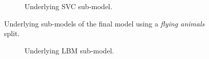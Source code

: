 \begin{figure}[ht]
\begin{subfigure}{.45\textwidth}
        \captionsetup{width=0.8\linewidth}
        \captionsetup{justification=centering}
        \caption{Underlying SVC sub-model.}
    \end{subfigure}
    \captionsetup{width=0.9\linewidth}
    \captionsetup{justification=centering}
    \caption{Underlying sub-models of the final model using a \textit{flying animals} split.}
\end{figure}

\begin{figure}[ht]
    \centering
    \begin{subfigure}{.45\textwidth}
        \centering
        \captionsetup{width=0.8\linewidth}
        \captionsetup{justification=centering}
        \caption{Underlying LBM sub-model.}
    \end{subfigure}
    \hspace{1cm}
    \begin{subfigure}{.45\textwidth}
        \centering

\end{subfigure}
\end{figure}
